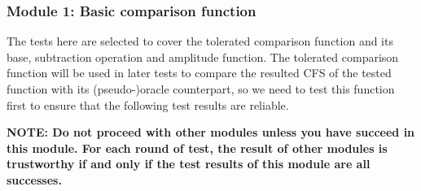 \documentclass[12pt, titlepage]{article}
\begin{document}
\subsubsection{Module 1: Basic comparison function}

The tests here are selected to cover the tolerated comparison function and its base, subtraction operation and amplitude function. The tolerated comparison function will be used in later tests to compare the resulted CFS of the tested function with its (pseudo-)oracle counterpart, so we need to test this function first to ensure that the following test results are reliable.

\textbf{NOTE: Do not proceed with other modules unless you have succeed in this module. For each round of test, the result of other modules is trustworthy if and only if the test results of this module are all successes.}
\end{document}
